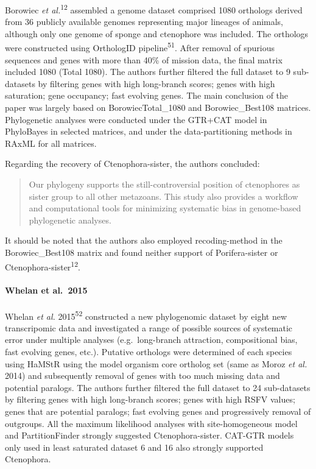 \documentclass[]{article}
\let\oldparagraph\paragraph
\renewcommand{\paragraph}[1]{\oldparagraph{#1}\mbox{}}
\begin{document}
Borowiec \emph{et al.}\textsuperscript{12} assembled a genome dataset
comprised 1080 orthologs derived from 36 publicly available genomes
representing major lineages of animals, although only one genome of
sponge and ctenophore was included. The orthologs were constructed using
OrthologID pipeline\textsuperscript{51}. After removal of spurious
sequences and genes with more than 40\% of mission data, the final
matrix included 1080 (Total 1080). The authors further filtered the full
dataset to 9 sub-datasets by filtering genes with high long-branch
scores; genes with high saturation; gene occupancy; fast evolving genes.
The main conclusion of the paper was largely based on
BorowiecTotal\_1080 and Borowiec\_Best108 matrices. Phylogenetic
analyses were conducted under the GTR+CAT model in PhyloBayes in
selected matrices, and under the data-partitioning methods in RAxML for
all matrices.

Regarding the recovery of Ctenophora-sister, the authors concluded:

\begin{quote}
Our phylogeny supports the still-controversial position of ctenophores
as sister group to all other metazoans. This study also provides a
workflow and computational tools for minimizing systematic bias in
genome-based phylogenetic analyses.
\end{quote}

It should be noted that the authors also employed recoding-method in the
Borowiec\_Best108 matrix and found neither support of Porifera-sister or
Ctenophora-sister\textsuperscript{12}.

\hypertarget{whelan-et-al.2015}{%
\paragraph{Whelan et al.~2015}\label{whelan-et-al.2015}}

Whelan \emph{et al.} 2015\textsuperscript{52} constructed a new
phylogenomic dataset by eight new transcripomic data and investigated a
range of possible sources of systematic error under multiple analyses
(e.g.~long-branch attraction, compositional bias, fast evolving genes,
etc.). Putative orthologs were determined of each species using HaMStR
using the model organism core ortholog set (same as Moroz \emph{et al.}
2014) and subsequently removal of genes with too much missing data and
potential paralogs. The authors further filtered the full dataset to 24
sub-datasets by filtering genes with high long-branch scores; genes with
high RSFV values; genes that are potential paralogs; fast evolving genes
and progressively removal of outgroups. All the maximum likelihood
analyses with site-homogeneous model and PartitionFinder strongly
suggested Ctenophora-sister. CAT-GTR models only used in least saturated
dataset 6 and 16 also strongly supported Ctenophora.
\end{document}
